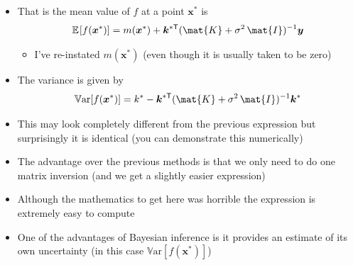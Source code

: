 \documentclass[11pt]{article}
\newcommand{\tr}{\textsf{T}}
\newcommand{\av}[2][]{\mathbb{E}_{#1\!}\left[ #2 \right]}
\begin{document}
\begin{itemize}
\begin{itemize}
$$       \sigma^2 \, \mat{I})^{-1}\bm{y},\, 
       k^*-\bm{k}^{*\tr}(\mat{K} + \sigma^2 \,
       \mat{I})^{-1}\bm{k}^*\right) $$
\item That is the mean value of \(f\) at a point \(\bm{x}^*\) is
$$ \av{f(\bm{x}^*)} =  m(\bm{x}^*) + \bm{k}^{*\tr}(\mat{K} +
       \sigma^2 \, \mat{I})^{-1}\bm{y} $$
\begin{itemize}
\item I've re-instated \(m(\bm{x}^*)\) (even though it is usually
taken to be zero)
\end{itemize}
\item The variance is given by
$$ \mathbb{V}\mathrm{ar}[f(\bm{x}^*)]  = k^*-\bm{k}^{*\tr}(\mat{K} + \sigma^2 \,
       \mat{I})^{-1}\bm{k}^* $$
\item This may look completely different from the previous expression
but surprisingly it is identical (you can demonstrate this numerically)
\item The advantage over the previous methods is that we only need to
do one matrix inversion (and we get a slightly easier expression)
\item Although the mathematics to get here was horrible the
expression is extremely easy to compute
\item One of the advantages of Bayesian inference is it provides an
estimate of its own uncertainty (in this case \(\mathbb{V}\mathrm{ar}[f(\bm{x}^*)]\))
\end{itemize}
\end{itemize}
\end{document}
